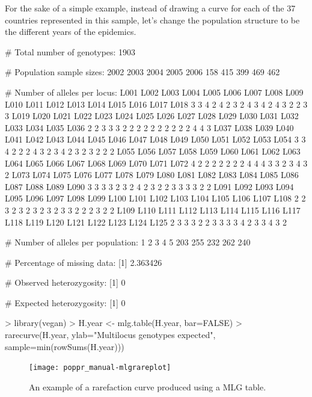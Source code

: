 \documentclass[letterpaper]{article}
\begin{document}
For the sake of a simple example, instead of drawing a curve for each of the 37 countries represented in this sample, let's change the population structure to be the different years of the epidemics. 
\begin{Schunk}
\begin{Soutput}
 # Total number of genotypes:  1903 

 # Population sample sizes:  
2002 2003 2004 2005 2006 
 158  415  399  469  462 

 # Number of alleles per locus:  
L001 L002 L003 L004 L005 L006 L007 L008 L009 L010 L011 L012 L013 L014 L015 L016 L017 L018 
   3    3    4    2    4    2    3    2    4    3    4    2    4    3    2    2    3    3 
L019 L020 L021 L022 L023 L024 L025 L026 L027 L028 L029 L030 L031 L032 L033 L034 L035 L036 
   2    2    3    3    3    2    2    2    2    2    2    2    2    2    2    4    4    3 
L037 L038 L039 L040 L041 L042 L043 L044 L045 L046 L047 L048 L049 L050 L051 L052 L053 L054 
   3    3    4    2    2    2    4    3    2    3    4    2    3    2    3    2    2    2 
L055 L056 L057 L058 L059 L060 L061 L062 L063 L064 L065 L066 L067 L068 L069 L070 L071 L072 
   4    2    2    2    2    2    2    2    4    4    4    3    3    2    3    4    3    2 
L073 L074 L075 L076 L077 L078 L079 L080 L081 L082 L083 L084 L085 L086 L087 L088 L089 L090 
   3    3    3    3    2    3    2    4    2    3    2    2    3    3    3    3    2    2 
L091 L092 L093 L094 L095 L096 L097 L098 L099 L100 L101 L102 L103 L104 L105 L106 L107 L108 
   2    2    3    2    3    2    3    2    3    2    3    3    2    2    2    3    2    2 
L109 L110 L111 L112 L113 L114 L115 L116 L117 L118 L119 L120 L121 L122 L123 L124 L125 
   2    3    3    3    2    2    3    3    3    3    4    2    3    3    4    3    2 

 # Number of alleles per population:  
  1   2   3   4   5 
203 255 232 262 240 

 # Percentage of missing data:  
[1] 2.363426

 # Observed heterozygosity:  
[1] 0

 # Expected heterozygosity:  
[1] 0
\end{Soutput}
\end{Schunk}
\begin{Schunk}
\begin{Sinput}
> library(vegan)
> H.year <- mlg.table(H.year, bar=FALSE)
> rarecurve(H.year, ylab="Multilocus genotypes expected", sample=min(rowSums(H.year)))
\end{Sinput}
\end{Schunk}
\begin{figure}[h!]
  \centering
  \caption{\footnotesize An example of a rarefaction curve produced using a MLG table.}
  \label{rarecurve}
\texttt{[image: poppr\_manual-mlgrareplot]}
\end{figure}
\newpage
\end{document}
